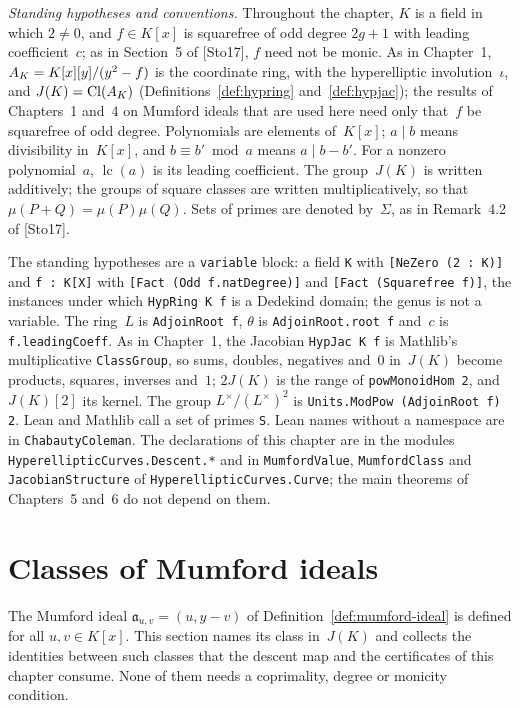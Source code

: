 \emph{Standing hypotheses and conventions.} Throughout the chapter, $K$ is a field in which
$2 \ne 0$, and $f \in K[x]$ is squarefree of odd degree $2g + 1$ with leading coefficient~$c$; as in
Section~5 of [Sto17], $f$ need not be monic. As in Chapter~1, $A_{K} = K[x][y]/(y^2 - f)$ is the
coordinate ring, with the hyperelliptic involution~$\iota$, and $J(K) = \operatorname{Cl}(A_{K})$
(Definitions~\ref{def:hypring} and~\ref{def:hypjac}); the results of Chapters~1 and~4 on Mumford
ideals that are used here need only that~$f$ be squarefree of odd degree. Polynomials are elements
of~$K[x]$; $a \mid b$ means divisibility in~$K[x]$, and $b \equiv b' \bmod a$ means $a \mid b - b'$.
For a nonzero polynomial~$a$, $\operatorname{lc}(a)$ is its leading coefficient. The group~$J(K)$ is
written additively; the groups of square classes are written multiplicatively, so that
$\mu(P + Q) = \mu(P)\mu(Q)$. Sets of primes are denoted by~$\Sigma$, as in Remark~4.2 of [Sto17].

\begin{remark}[Formalization]
The standing hypotheses are a \texttt{variable} block: a field \texttt{K} with
\texttt{[NeZero (2 : K)]} and \texttt{f : K[X]} with \texttt{[Fact (Odd f.natDegree)]} and
\texttt{[Fact (Squarefree f)]}, the instances under which \texttt{HypRing K f} is a Dedekind
domain; the genus is not a variable. The ring~$L$ is \texttt{AdjoinRoot f}, $\theta$ is
\texttt{AdjoinRoot.root f} and~$c$ is \texttt{f.leadingCoeff}. As in Chapter~1, the Jacobian
\texttt{HypJac K f} is Mathlib's multiplicative \texttt{ClassGroup}, so sums, doubles, negatives
and~$0$ in~$J(K)$ become products, squares, inverses and~$1$; $2J(K)$ is the range of
\texttt{powMonoidHom 2}, and $J(K)[2]$ its kernel. The group $L^\times/(L^\times)^2$ is
\texttt{Units.ModPow (AdjoinRoot f) 2}. Lean and Mathlib call a set of primes \texttt{S}. Lean
names without a namespace are in \texttt{ChabautyColeman}. The declarations of this chapter are in
the modules \texttt{HyperellipticCurves.Descent.*} and in \texttt{MumfordValue},
\texttt{MumfordClass} and \texttt{JacobianStructure} of \texttt{HyperellipticCurves.Curve}; the
main theorems of Chapters~5 and~6 do not depend on them.
\end{remark}

\section{Classes of Mumford ideals}
\label{sec:hv-classes}

The Mumford ideal $\mathfrak a_{u,v} = (u, y - v)$ of Definition~\ref{def:mumford-ideal} is
defined for all $u, v \in K[x]$. This section names its class in~$J(K)$ and collects the
identities between such classes that the descent map and the certificates of this chapter
consume. None of them needs a coprimality, degree or monicity condition.

